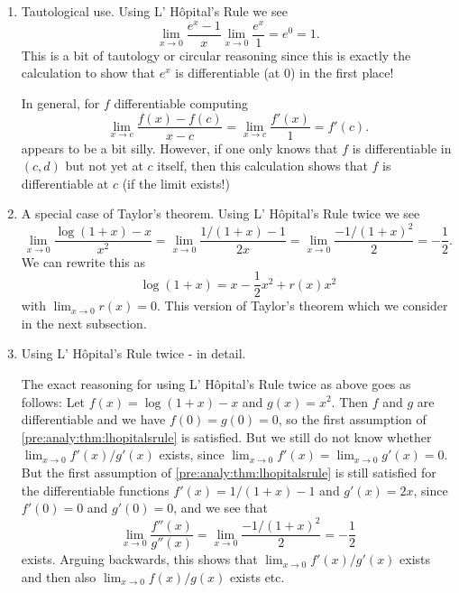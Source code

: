 \documentclass[10pt, a4paper]{article}
\newcommand{\lhopital}[0]{L' H\^opital}
\begin{document}
\begin{example}
    \begin{enumerate}[label = (\roman*)]
        \item Tautological use.
        Using L' H\^opital's Rule we see
        \[
        \lim_{x \rightarrow 0}\frac{e ^ {x} - 1}{x} \lim_{x \rightarrow 0}\frac{e ^ x}{1} = e ^ 0 = 1.
        \]
        This is a bit of tautology or circular reasoning since this is exactly the calculation to show that $e ^ x$ is differentiable
        (at $0$)
        in the first place!

        In general,
        for $f$ differentiable computing
        \[
        \lim_{x \rightarrow c}\frac{f(x) - f(c)}{x -c} = \lim_{x \rightarrow c}\frac{f'(x)}{1} = f'(c).
        \]
        appears to be a bit silly.
        However,
        if one only knows that $f$ is differentiable in $(c, d)$ but not yet at $c$ itself,
        then this calculation shows that $f$ is differentiable at $c$
        (if the limit exists!)
        
        \item A special case of Taylor's theorem.
        Using L' H\^opital's Rule twice we see
        \[
        \lim_{x \rightarrow 0}\frac{\log(1 + x) - x}{x ^ 2} = \lim_{x \rightarrow 0}\frac{1 / (1 + x) - 1}{2x} = \lim_{x \rightarrow 0}\frac{-1 / (1 + x) ^ 2}{2} = -\frac{1}{2}.
        \]
        We can rewrite this as
        \[
        \log(1 + x) = x - \frac{1}{2}x ^ 2 + r(x)x ^ 2
        \]
        with $\lim_{x \rightarrow 0}r(x) = 0$.
        This version of Taylor's theorem which we consider in the next subsection.

        \item Using \lhopital's Rule twice - in detail.

        The exact reasoning for using \lhopital's Rule twice as above goes as follows:
        Let $f(x) = \log(1 + x) - x$ and $g(x) = x ^ 2$.
        Then $f$ and $g$ are differentiable and we have $f(0) = g(0) = 0$,
        so the first assumption of \autoref{pre:analy:thm:lhopitalsrule} is satisfied.
        But we still do not know whether $\lim_{x \rightarrow 0}f'(x) / g'(x)$ exists,
        since $\lim_{x \rightarrow 0}f'(x) = \lim_{x \rightarrow 0}g'(x) = 0$.
        But the first assumption of \autoref{pre:analy:thm:lhopitalsrule} is still satisfied for the differentiable functions $f'(x) = 1 / (1 + x) - 1$ and $g'(x) = 2x$,
        since $f'(0) = 0$ and $g'(0) = 0$,
        and we see that
        \[
        \lim_{x \rightarrow 0}\frac{f''(x)}{g''(x)} = \lim_{x \rightarrow 0}\frac{-1 / (1 + x) ^ 2}{2} = -\frac{1}{2}
        \]
        exists.
        Arguing backwards,
        this shows that $\lim_{x \rightarrow 0}f'(x) / g'(x)$ exists and then also $\lim_{x \rightarrow 0}f(x) / g(x)$ exists etc.


\end{enumerate}
\end{example}
\end{document}
